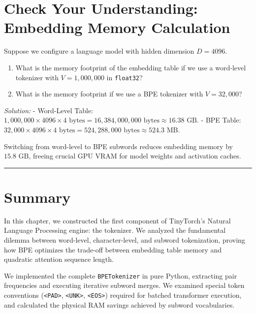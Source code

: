 \documentclass[
  letterpaper,
]{scrbook}
\providecommand{\tightlist}{%
  \setlength{\itemsep}{0pt}\setlength{\parskip}{0pt}}
\begin{document}
\section{Check Your Understanding: Embedding Memory
Calculation}\label{check-your-understanding-embedding-memory-calculation}

Suppose we configure a language model with hidden dimension
\(D = 4096\).

\begin{enumerate}
\def\labelenumi{\arabic{enumi}.}
\tightlist
\item
  What is the memory footprint of the embedding table if we use a
  word-level tokenizer with \(V = 1,000,000\) in \texttt{float32}?
\item
  What is the memory footprint if we use a BPE tokenizer with
  \(V = 32,000\)?
\end{enumerate}

\emph{Solution:} - Word-Level Table:
\(1,000,000 \times 4096 \times 4\text{ bytes} = 16,384,000,000\text{ bytes} \approx 16.38\text{ GB}\).
- BPE Table:
\(32,000 \times 4096 \times 4\text{ bytes} = 524,288,000\text{ bytes} \approx 524.3\text{ MB}\).

Switching from word-level to BPE subwords reduces embedding memory by
\textbf{\(15.8\text{ GB}\)}, freeing crucial GPU VRAM for model weights
and activation caches.

\begin{center}\rule{0.5\linewidth}{0.5pt}\end{center}

\section{Summary}\label{summary-10}

In this chapter, we constructed the first component of TinyTorch's
Natural Language Processing engine: the tokenizer. We analyzed the
fundamental dilemma between word-level, character-level, and subword
tokenization, proving how BPE optimizes the trade-off between embedding
table memory and quadratic attention sequence length.

We implemented the complete \texttt{BPETokenizer} in pure Python,
extracting pair frequencies and executing iterative subword merges. We
examined special token conventions
(\texttt{\textless{}PAD\textgreater{}},
\texttt{\textless{}UNK\textgreater{}},
\texttt{\textless{}EOS\textgreater{}}) required for batched transformer
execution, and calculated the physical RAM savings achieved by subword
vocabularies.
\end{document}

